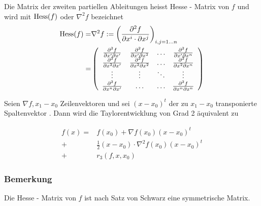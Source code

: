 \begin{definition}{8.53}
Die Matrix der zweiten partiellen Ableitungen heisst Hesse - Matrix von $f$ und wird mit $\operatorname{Hess}(f)$ oder $\nabla^2 f$ bezeichnet
\begin{align*}
\Hess(f)= & \nabla^2 f:=\left( \frac{\partial^2 f}{\partial x^i\cdot\partial x^j}\right)_{i,j=1\dots n}\\
 = & \left( {\begin{array}{*{20}{c}}
{\frac{{{\partial ^2}f}}{{\partial x'\partial x'}}}&{\frac{{{\partial ^2}f}}{{\partial x'\partial {x^2}}}}& \ldots &{\frac{{{\partial ^2}f}}{{\partial x'\partial {x^n}}}}\\
{\frac{{{\partial ^2}f}}{{\partial {x^2}\partial x'}}}&{\frac{{{\partial ^2}f}}{{\partial {x^2}\partial {x^2}}}}& \ldots &{\frac{{{\partial ^2}f}}{{\partial {x^2}\partial {x^n}}}}\\
 \vdots & \vdots & \ddots & \vdots \\
{\frac{{{\partial ^2}f}}{{\partial {x^n}\partial x'}}}& \ldots & \ldots &{\frac{{{\partial ^2}f}}{{\partial {x^n}\partial {x^n}}}}
\end{array}} \right)
\end{align*}
\end{definition}
Seien $\nabla f,x_1-x_0$ Zeilenvektoren und sei $\left( x-x_0\right)^t$ der zu $x_1-x_0$ transponierte Spaltenvektor . Dann wird die Taylorentwicklung von Grad 2 äquivalent zu

\begin{align*}
f(x) = & f\left( x_0\right) + \nabla f\left( x_0\right) \left( x-x_0\right)^t\\
+ & \frac{1}{2}\left( x-x_0\right)\cdot\nabla^2 f\left( x_0\right)\left( x-x_0\right)^t\\
+ & r_3\left( f,x,x_0\right)
\end{align*}

\subsubsection*{Bemerkung}
Die Hesse - Matrix von $f$ ist nach Satz von Schwarz eine symmetrische Matrix.

